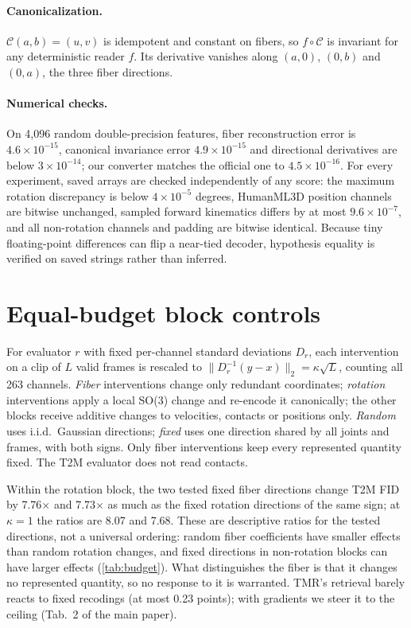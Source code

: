 \documentclass[10pt,twocolumn,letterpaper]{article}
\newcommand{\C}{\mathcal{C}}\newcommand{\G}{\mathcal{G}}\newcommand{\R}{\mathbb{R}}
\begin{document}
\paragraph{Canonicalization.} $\C(a,b)=(u,v)$ is idempotent and constant on fibers, so $f\circ\C$ is invariant for any deterministic reader $f$. Its derivative vanishes along $(a,0)$, $(0,b)$ and $(0,a)$, the three fiber directions.

\paragraph{Numerical checks.} On 4,096 random double-precision features, fiber reconstruction error is $4.6\times10^{-15}$, canonical invariance error $4.9\times10^{-15}$ and directional derivatives are below $3\times10^{-14}$; our converter matches the official one to $4.5\times10^{-16}$. For every experiment, saved arrays are checked independently of any score: the maximum rotation discrepancy is below $4\times10^{-5}$ degrees, HumanML3D position channels are bitwise unchanged, sampled forward kinematics differs by at most $9.6\times10^{-7}$, and all non-rotation channels and padding are bitwise identical. Because tiny floating-point differences can flip a near-tied decoder, hypothesis equality is verified on saved strings rather than inferred.

\section{Equal-budget block controls}\label{sec:budget}
For evaluator $r$ with fixed per-channel standard deviations $D_r$, each intervention on a clip of $L$ valid frames is rescaled to $\|D_r^{-1}(y-x)\|_2=\kappa\sqrt L$, counting all 263 channels. \emph{Fiber} interventions change only redundant coordinates; \emph{rotation} interventions apply a local SO(3) change and re-encode it canonically; the other blocks receive additive changes to velocities, contacts or positions only. \emph{Random} uses i.i.d.\ Gaussian directions; \emph{fixed} uses one direction shared by all joints and frames, with both signs. Only fiber interventions keep every represented quantity fixed. The T2M evaluator does not read contacts.



Within the rotation block, the two tested fixed fiber directions change T2M FID by 7.76$\times$ and 7.73$\times$ as much as the fixed rotation directions of the same sign; at $\kappa=1$ the ratios are 8.07 and 7.68. These are descriptive ratios for the tested directions, not a universal ordering: random fiber coefficients have smaller effects than random rotation changes, and fixed directions in non-rotation blocks can have larger effects (\cref{tab:budget}). What distinguishes the fiber is that it changes no represented quantity, so no response to it is warranted. TMR's retrieval barely reacts to fixed recodings (at most 0.23 points); with gradients we steer it to the ceiling (Tab.~2 of the main paper).
\end{document}
